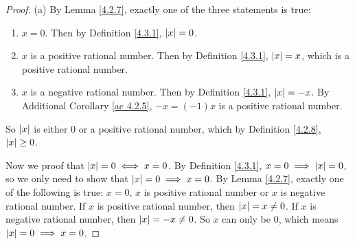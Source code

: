 \begin{proof}{(a)}
    By Lemma \ref{4.2.7}, exactly one of the three statements is true:
    \begin{enumerate}[label=(\roman*)]
        \item \(x = 0\).
              Then by Definition \ref{4.3.1}, \(\abs*{x} = 0\).
        \item \(x\) is a positive rational number.
              Then by Definition \ref{4.3.1}, \(\abs*{x} = x\), which is a positive rational number.
        \item \(x\) is a negative rational number.
              Then by Definition \ref{4.3.1}, \(\abs*{x} = -x\).
              By Additional Corollary \ref{ac 4.2.5}, \(-x = (-1)x\) is a positive rational number.
    \end{enumerate}
    So \(\abs*{x}\) is either \(0\) or a positive rational number, which by Definition \ref{4.2.8}, \(\abs*{x} \geq 0\).

    Now we proof that \(\abs*{x} = 0 \iff x = 0\).
    By Definition \ref{4.3.1}, \(x = 0 \implies \abs*{x} = 0\), so we only need to show that \(\abs*{x} = 0 \implies x = 0\).
    By Lemma \ref{4.2.7}, exactly one of the following is true:
    \(x = 0\), \(x\) is positive rational number or \(x\) is negative rational number.
    If \(x\) is positive rational number, then \(\abs*{x} = x \neq 0\).
    If \(x\) is negative rational number, then \(\abs*{x} = -x \neq 0\).
    So \(x\) can only be \(0\), which means \(\abs*{x} = 0 \implies x = 0\).
\end{proof}

